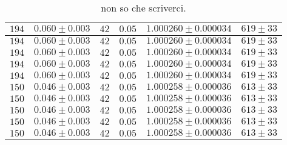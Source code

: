 \documentclass[]{article}
\begin{document}
\begin{table}[H]
\begin{tabular}{||c|c||c|c||c|c||}
        \hline
        $194$ & $0.060 \pm 0.003$ & $42$ & $0.05$ & $1.000260 \pm 0.000034$ & $619 \pm 33$ \\\hline
        $194$ & $0.060 \pm 0.003$ & $42$ & $0.05$ & $1.000260 \pm 0.000034$ & $619 \pm 33$ \\\hline
        $194$ & $0.060 \pm 0.003$ & $42$ & $0.05$ & $1.000260 \pm 0.000034$ & $619 \pm 33$ \\\hline
        $194$ & $0.060 \pm 0.003$ & $42$ & $0.05$ & $1.000260 \pm 0.000034$ & $619 \pm 33$ \\\hline
        $194$ & $0.060 \pm 0.003$ & $42$ & $0.05$ & $1.000260 \pm 0.000034$ & $619 \pm 33$ \\\hline
        \hline
        $150$ & $0.046 \pm 0.003$ & $42$ & $0.05$ & $1.000258 \pm 0.000036$ & $613 \pm 33$ \\\hline
        $150$ & $0.046 \pm 0.003$ & $42$ & $0.05$ & $1.000258 \pm 0.000036$ & $613 \pm 33$ \\\hline
        $150$ & $0.046 \pm 0.003$ & $42$ & $0.05$ & $1.000258 \pm 0.000036$ & $613 \pm 33$ \\\hline
        $150$ & $0.046 \pm 0.003$ & $42$ & $0.05$ & $1.000258 \pm 0.000036$ & $613 \pm 33$ \\\hline
        $150$ & $0.046 \pm 0.003$ & $42$ & $0.05$ & $1.000258 \pm 0.000036$ & $613 \pm 33$ \\\hline
        
    \end{tabular}
    \caption{non so che scriverci.}
    \label{tab:n_a}
\end{table}
\end{document}

